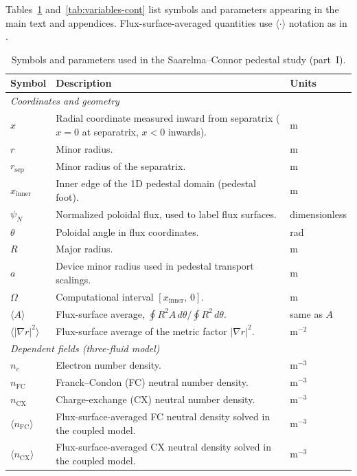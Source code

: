 \documentclass[twocolumn,secnumarabic,amssymb, nobibnotes, aps, prd]{revtex4-2}
\begin{document}
Tables~\ref{tab:variables} and~\ref{tab:variables-cont} list symbols and parameters appearing in the main text and appendices.
Flux-surface-averaged quantities use $\langle\cdot\rangle$ notation as in \cite{saarelma2023testing}.

\begin{table}[t]
\caption{\label{tab:variables}Symbols and parameters used in the Saarelma--Connor pedestal study (part~I).}
\begin{ruledtabular}
\begin{tabular}{lll}
Symbol & Description & Units \\
\hline
\multicolumn{3}{l}{\textit{Coordinates and geometry}} \\
$x$ & Radial coordinate measured inward from separatrix ($x=0$ at separatrix, $x<0$ inwards). & m \\
$r$ & Minor radius. & m \\
$r_{\mathrm{sep}}$ & Minor radius of the separatrix. & m \\
$x_{\mathrm{inner}}$ & Inner edge of the 1D pedestal domain (pedestal foot). & m \\
$\psi_N$ & Normalized poloidal flux, used to label flux surfaces. & dimensionless \\
$\theta$ & Poloidal angle in flux coordinates. & rad \\
$R$ & Major radius. & m \\
$a$ & Device minor radius used in pedestal transport scalings. & m \\
$\Omega$ & Computational interval $[x_{\mathrm{inner}},\,0]$. & m \\
$\langle A\rangle$ & Flux-surface average, $\oint R^2 A\,d\theta / \oint R^2\,d\theta$. & same as $A$ \\
$\langle|\nabla r|^2\rangle$ & Flux-surface average of the metric factor $|\nabla r|^2$. & m$^{-2}$ \\
\hline
\multicolumn{3}{l}{\textit{Dependent fields (three-fluid model)}} \\
$n_e$ & Electron number density. & m$^{-3}$ \\
$n_{\mathrm{FC}}$ & Franck--Condon (FC) neutral number density. & m$^{-3}$ \\
$n_{\mathrm{CX}}$ & Charge-exchange (CX) neutral number density. & m$^{-3}$ \\
$\langle n_{\mathrm{FC}}\rangle$ & Flux-surface-averaged FC neutral density solved in the coupled model. & m$^{-3}$ \\
$\langle n_{\mathrm{CX}}\rangle$ & Flux-surface-averaged CX neutral density solved in the coupled model. & m$^{-3}$ \\

\end{tabular}
\end{ruledtabular}
\end{table}
\end{document}
